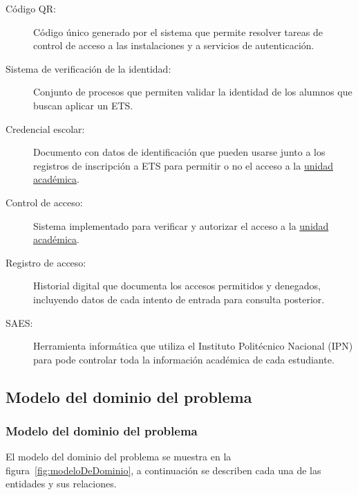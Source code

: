 \begin{description}
	\item[\hypertarget{tCodigoQR}{Código QR:}] Código único generado por el sistema que permite resolver tareas de control de acceso a las instalaciones y a servicios de autenticación.
	
	\item[\hypertarget{tSistemaVerificacion}{Sistema de verificación de la identidad:}] Conjunto de procesos que permiten validar la identidad de los alumnos que buscan aplicar un ETS.
	
	\item[\hypertarget{tCredencialEscolar}{Credencial escolar:}] Documento con datos de identificación que pueden usarse junto a los registros de inscripción a ETS para permitir o no el acceso a la \hyperlink{tUnidadAcademica}{unidad académica}.
	
	\item[\hypertarget{tControlAcceso}{Control de acceso:}] Sistema implementado para verificar y autorizar el acceso a la \hyperlink{tUnidadAcademica}{unidad académica}.
	
	\item[\hypertarget{tRegistroAcceso}{Registro de acceso:}] Historial digital que documenta los accesos permitidos y denegados, incluyendo datos de cada intento de entrada para consulta posterior.
	
	\item[\hypertarget{tSAES}{SAES:}] Herramienta informática que utiliza el Instituto Politécnico Nacional (IPN) para pode controlar toda la información académica de cada estudiante.
	
\end{description}


\subsection{Modelo del dominio del problema}
\label{sec:modeloDeDominioP}


\subsubsection{Modelo del dominio del problema}

El modelo del dominio del problema se muestra en la figura~\ref{fig:modeloDeDominio}, a continuación se describen cada una de las entidades y sus relaciones.

